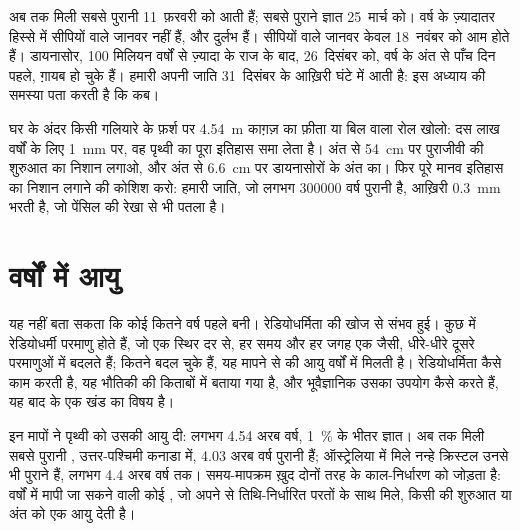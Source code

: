 अब तक मिली सबसे पुरानी  11~फ़रवरी को आती हैं; सबसे पुराने ज्ञात 
25~मार्च को। वर्ष के ज़्यादातर हिस्से में सीपियों वाले जानवर नहीं हैं, और 
दुर्लभ हैं। सीपियों वाले जानवर केवल 18~नवंबर को आम होते हैं। डायनासोर, \num{100}
मिलियन वर्षों से ज़्यादा के राज के बाद, 26~दिसंबर को, वर्ष के अंत से पाँच दिन पहले,
ग़ायब हो चुके हैं। हमारी अपनी जाति 31~दिसंबर के आख़िरी घंटे में आती है: इस अध्याय
की समस्या पता करती है कि
कब।

\begin{inthelab}[समय का फ़ीता]
घर के अंदर किसी गलियारे के फ़र्श पर \qty{4.54}{m} काग़ज़ का फ़ीता या बिल वाला रोल
खोलो: दस लाख वर्षों के लिए \qty{1}{mm} पर, वह पृथ्वी का पूरा इतिहास समा लेता है।
अंत से \qty{54}{cm} पर पुराजीवी की शुरुआत का निशान लगाओ, और अंत से \qty{6.6}{cm}
पर डायनासोरों के अंत का। फिर पूरे मानव इतिहास का निशान लगाने की कोशिश करो: हमारी
जाति, जो लगभग \num{300000} वर्ष पुरानी है, आख़िरी \qty{0.3}{mm} भरती है, जो
पेंसिल की रेखा से भी पतला है।
\end{inthelab}

\section{वर्षों में आयु}

 यह नहीं बता सकता कि कोई  कितने वर्ष पहले बनी।  रेडियोधर्मिता की खोज से संभव हुई। कुछ  में रेडियोधर्मी परमाणु होते हैं,
जो एक स्थिर दर से, हर समय और हर जगह एक जैसी, धीरे-धीरे दूसरे परमाणुओं में बदलते
हैं; कितने बदल चुके हैं, यह मापने से  की आयु वर्षों में मिलती है। रेडियोधर्मिता
कैसे काम करती है, यह भौतिकी की किताबों में बताया गया है, और भूवैज्ञानिक उसका उपयोग
कैसे करते हैं, यह बाद के एक खंड का
विषय है।

इन मापों ने पृथ्वी को उसकी आयु दी: लगभग \num{4.54} अरब वर्ष, 1~\% के भीतर ज्ञात।
अब तक मिली सबसे पुरानी , उत्तर-पश्चिमी कनाडा में, \num{4.03} अरब वर्ष
पुरानी हैं; ऑस्ट्रेलिया में मिले नन्हे क्रिस्टल उनसे भी पुराने हैं, लगभग \num{4.4}
अरब वर्ष तक। समय-मापक्रम ख़ुद दोनों तरह के काल-निर्धारण को जोड़ता है: वर्षों में
मापी जा सकने वाली कोई , जो अपने  से तिथि-निर्धारित परतों के साथ मिले,
किसी  की शुरुआत या अंत को एक आयु
देती है।

